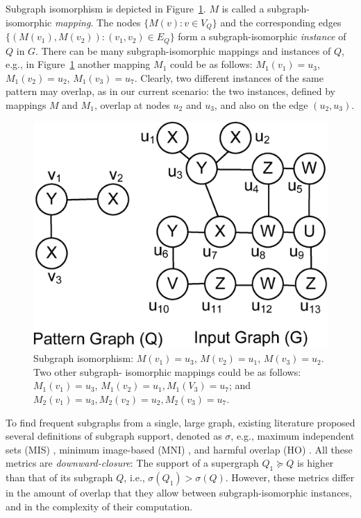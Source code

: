 Subgraph isomorphism is depicted in Figure~\ref{fig:subgraph_isomorphism}. $M$ is called a subgraph-isomorphic
{\em mapping}. The nodes $\{M(v):v\in V_Q\}$ and the corresponding edges $\{(M(v_1),M(v_2)):(v_1,v_2)\in E_Q\}$
form a subgraph-isomorphic {\em instance} of $Q$ in $G$.
There can be many subgraph-isomorphic mappings and instances of $Q$, e.g., in Figure~\ref{fig:subgraph_isomorphism}
another mapping $M_1$ could be as follows: $M_1(v_1)= u_3$, $M_1(v_2)= u_2$, $M_1(v_3)= u_7$. Clearly, two different
instances of the same pattern may overlap, as in our current scenario: the two instances, defined by mappings $M$
and $M_1$, overlap at nodes $u_2$ and $u_3$,
and also on the edge $(u_2,u_3)$.
%
\begin{figure}[t!]
\centering
\includegraphics[scale=0.23]{images/subgraph_isomorphism}
\vspace{-2mm}
\caption{\small Subgraph isomorphism: $M(v_1)= u_3$, $M(v_2)= u_1$, $M(v_3)= u_2$. Two other subgraph-
isomorphic mappings could be as follows: $M_1(v_1)=u_3$, $M_1(v_2)=u_1, M_1(V_3)=u_7$; and
$M_2(v_1)=u_3, M_2(v_2)=u_2, M_2(v_3)=u_7$.}
\label{fig:subgraph_isomorphism}
\vspace{-5mm}
\end{figure}

To find frequent subgraphs from a single, large graph, existing literature 
proposed several definitions of subgraph support, denoted as $\sigma$, e.g., maximum independent sets (MIS) \cite{KK04}, 
minimum image-based (MNI) \cite{BN08}, and harmful overlap (HO) \cite{FB07}.
All these metrics are {\em downward-closure}: The support of a supergraph 
$Q_1 \succeq Q$ is higher than that of its subgraph $Q$, i.e., $\sigma(Q_1) > \sigma(Q)$.
However, these metrics differ in the amount of overlap that they allow between subgraph-isomorphic 
instances, and in the complexity of their computation.

